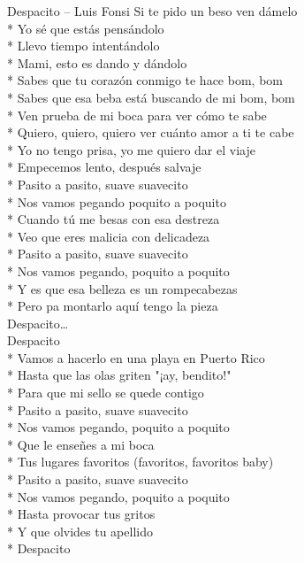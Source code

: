 \begin{piosenka_dluga}{Despacito -- Luis Fonsi}
Si te pido un beso ven dámelo \\*
Yo sé que estás pensándolo \\*
Llevo tiempo intentándolo \\*
Mami, esto es dando y dándolo \\*
Sabes que tu corazón conmigo te hace bom, bom \\* 
Sabes que esa beba está buscando de mi bom, bom \\*
Ven prueba de mi boca para ver cómo te sabe \\*
Quiero, quiero, quiero ver cuánto amor a ti te cabe \\*
Yo no tengo prisa, yo me quiero dar el viaje \\*
Empecemos lento, después salvaje \\*
Pasito a pasito, suave suavecito \\*
Nos vamos pegando poquito a poquito \\*
Cuando tú me besas con esa destreza \\*
Veo que eres malicia con delicadeza \\*
Pasito a pasito, suave suavecito \\*
Nos vamos pegando, poquito a poquito \\*
Y es que esa belleza es un rompecabezas \\*
Pero pa montarlo aquí tengo la pieza \\[\zwrotkaspace]

 Despacito\ldots \\[\zwrotkaspace]

Despacito \\*
Vamos a hacerlo en una playa en Puerto Rico \\*
Hasta que las olas griten "¡ay, bendito!" \\*
Para que mi sello se quede contigo \\*
Pasito a pasito, suave suavecito \\*
Nos vamos pegando, poquito a poquito \\*
Que le enseñes a mi boca \\*
Tus lugares favoritos (favoritos, favoritos baby) \\*
Pasito a pasito, suave suavecito \\*
Nos vamos pegando, poquito a poquito \\*
Hasta provocar tus gritos \\*
Y que olvides tu apellido \\*
Despacito \\[\zwrotkaspace]


\end{piosenka_dluga}
